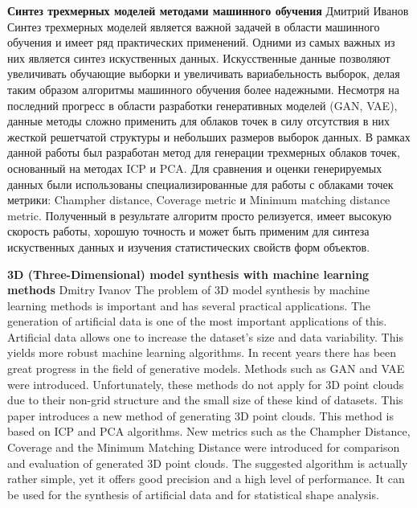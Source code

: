 \noindent\textbf{Синтез трехмерных моделей методами машинного обучения}
\newline
Дмитрий Иванов 
\newline
Синтез трехмерных моделей является важной задачей в области машинного обучения и имеет ряд практических применений. Одними из самых важных из них является синтез искуственных данных. Искусственные данные позволяют увеличивать обучающие выборки и увеличивать вариабельность выборок, делая таким образом алгоритмы машинного обучения более надежными. Несмотря на последний прогресс в области разработки генеративных моделей (GAN, VAE), данные методы сложно применить для облаков точек в силу отсутствия в них жесткой решетчатой структуры и небольших размеров выборок данных. В рамках данной работы был разработан метод для генерации трехмерных облаков точек, основанный на методах ICP и PCA. Для сравнения и оценки генерируемых данных были использованы специализированные для работы с облаками точек метрики: Champher distance, Coverage metric и Minimum matching distance metric. Полученный в результате алгоритм просто релизуется, имеет высокую скорость работы, хорошую точность и может быть применим для синтеза искуственных данных и изучения статистических свойств форм объектов.

\bigskip

\noindent\textbf{3D (Three-Dimensional) model synthesis with machine learning methods}
\newline
Dmitry Ivanov
\newline
The problem of 3D model synthesis by machine learning methods is important and has several practical applications.
The generation of artificial data is one of the most important applications of this. Artificial data allows one to increase the dataset's size and data variability. This yields more robust machine learning algorithms. In recent years there has been great progress in the field of generative models. Methods such as GAN and VAE were introduced. Unfortunately, these methods do not apply for 3D point clouds due to their non-grid structure and the small size of these kind of datasets. This paper introduces a new method of generating 3D point clouds. This method is based on ICP and PCA algorithms. New metrics such as the Champher Distance, Coverage and the Minimum Matching Distance were introduced for comparison and evaluation of generated 3D point clouds. The suggested algorithm is actually rather simple, yet it offers good precision and a high level of performance. It can be used for the synthesis of artificial data and for statistical shape analysis.